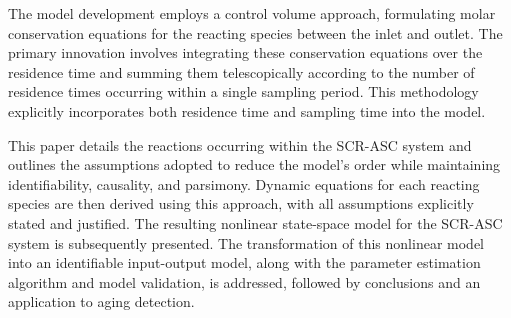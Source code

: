 The model development employs a control volume approach, formulating molar conservation equations for the reacting
species between the inlet and outlet. The primary innovation involves integrating these conservation equations over the
residence time and summing them telescopically according to the number of residence times occurring within a single
sampling period. This methodology explicitly incorporates both residence time and sampling time into the model.

This paper details the reactions occurring within the SCR-ASC system and outlines the assumptions adopted to reduce the
model's order while maintaining identifiability, causality, and parsimony. Dynamic equations for each reacting species
are then derived using this approach, with all assumptions explicitly stated and justified. The resulting nonlinear
state-space model for the SCR-ASC system is subsequently presented. The transformation of this nonlinear model into an
identifiable input-output model, along with the parameter estimation algorithm and model validation, is addressed,
followed by conclusions and an application to aging detection.
